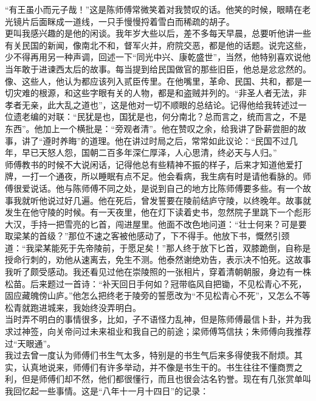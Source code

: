 “有王虽小而元子哉！”这是陈师傅常微笑着对我赞叹的话。他笑的时候，眼睛在老光镜片后面眯成一道线，一只手慢慢捋着雪白而稀疏的胡子。\\

更叫我感兴趣的是他的闲谈。我年岁大些以后，差不多每天早晨，总要听他讲一些有关民国的新闻，像南北不和，督军火并，府院交恶，都是他的话题。说完这些，少不得再用另一种声调，回述一下“同光中兴、康乾盛世”，当然，他特别喜欢说他当年敢于进谏西太后的故事。每当提到给民国做官的那些旧臣，他总是忿忿然的。像、这些人，他认为都应该列入贰臣传里。在他嘴里，革命、民国、共和，都是一切灾难的根源，和这些字眼有关的人物，都是和盗贼并列的。“非圣人者无法，非孝者无亲，此大乱之道也”，这是他对一切不顺眼的总结论。记得他给我转述过一位遗老编的对联：“民犹是也，国犹是也，何分南北？总而言之，统而言之，不是东西”。他加上一个横批是：“旁观者清”。他在赞叹之余，给我讲了卧薪尝胆的故事，讲了“遵时养晦”的道理。他在讲过时局之后，常常如此议论：“民国不过几年，早已天怒人怨，国朝二百多年深仁厚泽，人心思清，终必天与人归。”\\

师傅教书的时候不大说闲话，记得他总有些精神不振的样子，后来才知道他爱打牌，一打一个通夜，所以睡眠有点不足。他会看病，我生病有时是请他看脉的。师傅很爱说话。他与陈师傅不同之处，是说到自己的地方比陈师傅要多些。有一个故事我就听他说过好几遍。他在死后，曾发誓要在陵前结庐守陵，以终晚年。故事就发生在他守陵的时候。有一天夜里，他在灯下读着史书，忽然院子里跳下一个彪形大汉，手持一把雪亮的匕首，闯进屋里。他面不改色地问道：“壮士何来？可是要取梁某的首级？”那位不速之客被他感动了，下不得手。他放下书，慨然引颈道：“我梁某能死于先帝陵前，于愿足矣！”那人终于放下匕首，双膝跪倒，自称是授命行刺的，劝他从速离去，免生不测。他泰然谢绝劝告，表示决不怕死。这故事我听了颇受感动。我还看见过他在崇陵照的一张相片，穿着清朝朝服，身边有一株松苗。后来题过一首诗：“补天回日手何如？冠带临风自把锄，不见松青心不死，固应藏魄傍山庐。”他怎么把终老于陵旁的誓愿改为“不见松青心不死”，又怎么不等松青就跑进城来，我始终没弄明白。\\

当时弄不明白的事情很多，比如，子不语怪力乱神，但是陈师傅最信卜卦，并为我求过神签，向关帝问过未来祖业和我自己的前途；梁师傅笃信扶；朱师傅向我推荐过“天眼通”。\\

我过去曾一度认为师傅们书生气太多，特别是的书生气后来多得使我不耐烦。其实，认真地说来，师傅们有许多举动，并不像是书生干的。书生往往不懂商贾之利，但是师傅们却不然，他们都很懂行，而且也很会沽名钓誉。现在有几张赏单叫我回忆起一些事情。这是“八年十一月十四日”的记录：\\

